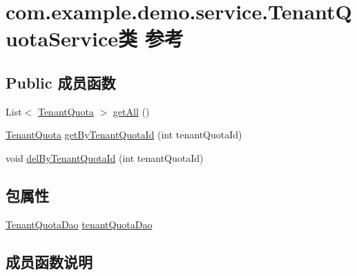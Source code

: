 \hypertarget{classcom_1_1example_1_1demo_1_1service_1_1_tenant_quota_service}{}\section{com.\+example.\+demo.\+service.\+Tenant\+Quota\+Service类 参考}
\label{classcom_1_1example_1_1demo_1_1service_1_1_tenant_quota_service}
\subsection*{Public 成员函数}
\begin{DoxyCompactItemize}
\item 
List$<$ \mbox{\hyperlink{classcom_1_1example_1_1demo_1_1modular_1_1_tenant_quota}{Tenant\+Quota}} $>$ \mbox{\hyperlink{classcom_1_1example_1_1demo_1_1service_1_1_tenant_quota_service_a412155ae555a4c3ebd7dff122fca2396}{get\+All}} ()
\item 
\mbox{\hyperlink{classcom_1_1example_1_1demo_1_1modular_1_1_tenant_quota}{Tenant\+Quota}} \mbox{\hyperlink{classcom_1_1example_1_1demo_1_1service_1_1_tenant_quota_service_a0cf51436f7094a4e4a2dad983ded9257}{get\+By\+Tenant\+Quota\+Id}} (int tenant\+Quota\+Id)
\item 
void \mbox{\hyperlink{classcom_1_1example_1_1demo_1_1service_1_1_tenant_quota_service_a3d2bd52b7310c3382657c4693b66522e}{del\+By\+Tenant\+Quota\+Id}} (int tenant\+Quota\+Id)
\end{DoxyCompactItemize}
\subsection*{包属性}
\begin{DoxyCompactItemize}
\item 
\mbox{\hyperlink{interfacecom_1_1example_1_1demo_1_1dao_1_1_tenant_quota_dao}{Tenant\+Quota\+Dao}} \mbox{\hyperlink{classcom_1_1example_1_1demo_1_1service_1_1_tenant_quota_service_a5b93e7b30f321a4c5c01338bf127768e}{tenant\+Quota\+Dao}}
\end{DoxyCompactItemize}


\subsection{成员函数说明}
\mbox{\label{classcom_1_1example_1_1demo_1_1service_1_1_tenant_quota_service_a3d2bd52b7310c3382657c4693b66522e}} 
